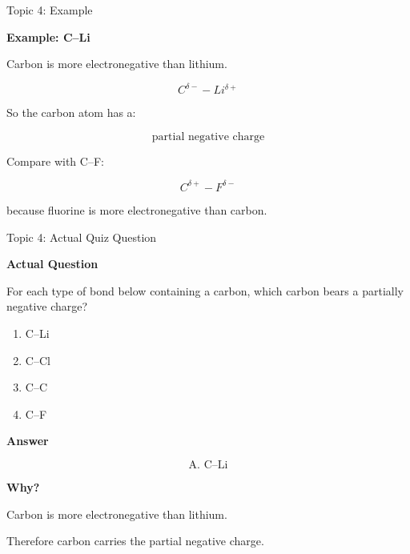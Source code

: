 \documentclass[aspectratio=169]{beamer}
\begin{document}
\begin{frame}[t]{Topic 4: Example}
\small

\textbf{Example: C--Li}

Carbon is more electronegative than lithium.

\[
C^{\delta-}-Li^{\delta+}
\]

So the carbon atom has a:

\[
\boxed{\text{partial negative charge}}
\]

Compare with C--F:

\[
C^{\delta+}-F^{\delta-}
\]

because fluorine is more electronegative than carbon.

\end{frame}

\begin{frame}[t]{Topic 4: Actual Quiz Question}
\scriptsize

\textbf{Actual Question}

For each type of bond below containing a carbon, which carbon bears a partially negative charge?

\vspace{0.08cm}

\begin{enumerate}
    \setlength{\itemsep}{0.04cm}
    \item[A.] C--Li
    \item[B.] C--Cl
    \item[C.] C--C
    \item[D.] C--F
\end{enumerate}

\vspace{0.08cm}

\textbf{Answer}

\[
\boxed{\text{A. C--Li}}
\]

\vspace{-0.12cm}

\textbf{Why?}

Carbon is more electronegative than lithium.

Therefore carbon carries the partial negative charge.

\end{frame}
\end{document}
